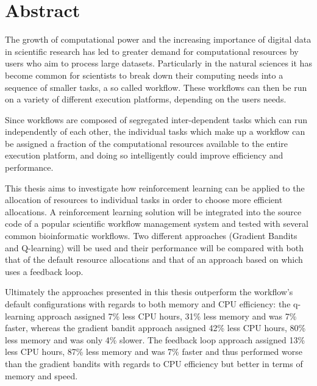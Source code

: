 
\cleardoublepage
{}
\section*{Abstract}

The growth of computational power and the increasing importance of digital data in scientific research has led to greater demand for computational resources  by users who aim to process large datasets. Particularly in the natural sciences it has become common for scientists to break down their computing needs into a sequence of smaller tasks, a so called workflow. These workflows can then be run on a variety of different execution platforms, depending on the users needs.

Since workflows are composed of segregated inter-dependent tasks which can run independently of each other, the individual tasks which make up a workflow can be assigned a fraction of the computational resources available to the entire execution platform, and doing so intelligently could improve efficiency and performance.

This thesis aims to investigate how reinforcement learning can be applied to the allocation of resources to individual tasks in order to choose more efficient allocations. A reinforcement learning solution will be integrated into the source code of a popular scientific workflow management system and tested with several common bioinformatic workflows. Two different approaches (Gradient Bandits and Q-learning) will be used and their performance will be compared with both that of the default resource allocations and that of an approach based on \cite{tovarjob,FeedbackBasedAllocation} which uses a feedback loop.

Ultimately the approaches presented in this thesis outperform the workflow's default configurations with regards to both memory and CPU efficiency: the q-learning approach assigned 7\% less CPU hours, 31\% less memory and was 7\% faster, whereas the gradient bandit approach assigned 42\% less CPU hours, 80\% less memory and was only 4\% slower. The feedback loop approach assigned 13\% less CPU hours, 87\% less memory and was 7\% faster and thus performed worse than the gradient bandits with regards to CPU efficiency but better in terms of memory and speed. 

{}
